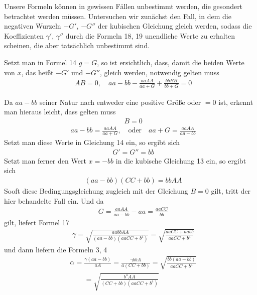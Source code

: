 \begingroup
\renewcommand{\arraystretch}{1.45}

Unsere Formeln können in gewissen Fällen unbestimmt werden, die gesondert betrachtet werden müssen. Untersuchen wir zunächst den Fall, in dem die negativen Wurzeln $-G'$, $-G''$ der kubischen Gleichung gleich werden, sodass die Koeffizienten $\gamma'$, $\gamma''$ durch die Formeln 18, 19 unendliche Werte zu erhalten scheinen, die aber tatsächlich unbestimmt sind.

Setzt man in Formel 14 $g=G$, so ist ersichtlich, dass, damit die beiden Werte von $x$, das heißt $-G'$ und $-G''$, gleich werden, notwendig gelten muss
\[
\begin{aligned}
&AB=0,\quad aa-bb-\frac{aaAA}{aa+G}+\frac{bbBB}{bb+G}=0
\end{aligned}
\]
\par Da $aa-bb$ seiner Natur nach entweder eine positive Größe oder $=0$ ist, erkennt man hieraus leicht, dass gelten muss
\[
\begin{aligned}
&B=0
\end{aligned}
\]
\[
\begin{aligned}
&aa-bb=\frac{aaAA}{aa+G},\quad\text{oder}\quad aa+G=\frac{aaAA}{aa-bb}
\end{aligned}
\]
Setzt man diese Werte in Gleichung 14 ein, so ergibt sich
\[
\begin{aligned}
&G'=G''=bb
\end{aligned}
\]
Setzt man ferner den Wert $x=-bb$ in die kubische Gleichung 13 ein, so ergibt sich
\[
\begin{aligned}
&(aa-bb)(CC+bb)=bbAA
\end{aligned}
\]
Sooft diese Bedingungsgleichung zugleich mit der Gleichung $B=0$ gilt, tritt der hier behandelte Fall ein. 
Und da
\[
\begin{aligned}
&G=\frac{aaAA}{aa-bb}-aa=\frac{aaCC}{bb}
\end{aligned}
\]
\noindent{}
gilt, liefert Formel 17
\[
\begin{aligned}
&\gamma=\surd{\frac{aabbAA}{(aa-bb)(aaCC+b^4)}}
=\surd{\frac{aaCC+aabb}{aaCC+b^4}}
\end{aligned}
\]
und dann liefern die Formeln 3, 4
\[
\begin{aligned}
&\alpha=\frac{\gamma(aa-bb)}{aA}=\frac{\gamma bbA}{a(CC+bb)}
=\surd{\frac{bb(aa-bb)}{aaCC+b^4}}
\\[6pt]
&\qquad{}=\surd{\frac{b^4AA}{(CC+bb)(aaCC+b^4)}}
\end{aligned}
\]
